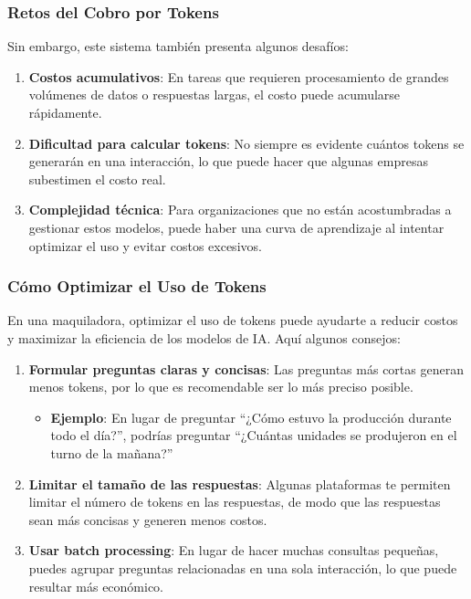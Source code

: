 \documentclass[
  10pt,
  letterpaper,
]{book}
\providecommand{\tightlist}{%
  \setlength{\itemsep}{0pt}\setlength{\parskip}{0pt}}\usepackage{longtable,booktabs,array}
\begin{document}
\subsubsection{\texorpdfstring{\textbf{Retos del Cobro por
Tokens}}{Retos del Cobro por Tokens}}\label{retos-del-cobro-por-tokens}

Sin embargo, este sistema también presenta algunos desafíos:

\begin{enumerate}
\def\labelenumi{\arabic{enumi}.}
\tightlist
\item
  \textbf{Costos acumulativos}: En tareas que requieren procesamiento de
  grandes volúmenes de datos o respuestas largas, el costo puede
  acumularse rápidamente.
\item
  \textbf{Dificultad para calcular tokens}: No siempre es evidente
  cuántos tokens se generarán en una interacción, lo que puede hacer que
  algunas empresas subestimen el costo real.
\item
  \textbf{Complejidad técnica}: Para organizaciones que no están
  acostumbradas a gestionar estos modelos, puede haber una curva de
  aprendizaje al intentar optimizar el uso y evitar costos excesivos.
\end{enumerate}

\subsubsection{\texorpdfstring{\textbf{Cómo Optimizar el Uso de
Tokens}}{Cómo Optimizar el Uso de Tokens}}\label{cuxf3mo-optimizar-el-uso-de-tokens}

En una maquiladora, optimizar el uso de tokens puede ayudarte a reducir
costos y maximizar la eficiencia de los modelos de IA. Aquí algunos
consejos:

\begin{enumerate}
\def\labelenumi{\arabic{enumi}.}
\item
  \textbf{Formular preguntas claras y concisas}: Las preguntas más
  cortas generan menos tokens, por lo que es recomendable ser lo más
  preciso posible.

  \begin{itemize}
  \tightlist
  \item
    \textbf{Ejemplo}: En lugar de preguntar ``¿Cómo estuvo la producción
    durante todo el día?'', podrías preguntar ``¿Cuántas unidades se
    produjeron en el turno de la mañana?''
  \end{itemize}
\item
  \textbf{Limitar el tamaño de las respuestas}: Algunas plataformas te
  permiten limitar el número de tokens en las respuestas, de modo que
  las respuestas sean más concisas y generen menos costos.
\item
  \textbf{Usar batch processing}: En lugar de hacer muchas consultas
  pequeñas, puedes agrupar preguntas relacionadas en una sola
  interacción, lo que puede resultar más económico.
\end{enumerate}
\end{document}
